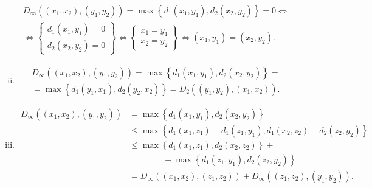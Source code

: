 \begin{eje}
\begin{enumerate}[(a)]
\begin{enumerate}[i)]
            \begin{gather*}
                D_{\infty} \left( \left( x_1, x_2 \right) , \left( y_1 , y_2 \right) \right) = \max \left\{ d_1 \left( x_1, y_1\right) , d_2 \left( x_2 , y_2 \right) \right\} = 0  \iff \\
                \iff \left\{ \begin{array}{c}
                    d_1 \left( x_1, y_1 \right) = 0 \\
                    d_2 \left( x_2, y_2 \right) = 0
                \end{array} \right\} \iff  \left\{ \begin{array}{c}
                    x_1=y_1 \\
                    x_2=y_2
                \end{array} \right\} \iff \left( x_1, y_1 \right) = \left( x_2, y_2 \right).
            \end{gather*}
            \item 
            \begin{gather*}
                D_{\infty} \left( \left( x_1, x_2 \right) , \left( y_1 , y_2 \right) \right) = \max \left\{ d_1 \left( x_1, y_1\right)  , d_2 \left( x_2 , y_2 \right) \right\} = \\
                = \max \left\{ d_1 \left( y_1, x_1\right) , d_2 \left( y_2 , x_2 \right) \right\} =D_2 \left( \left( y_1, y_2 \right) , \left( x_1 , x_2 \right) \right) .
            \end{gather*}
            \item 
            \begin{align*}
                D_{\infty} \left( \left( x_1, x_2 \right) , \left( y_1 , y_2 \right) \right) &= \max \left\{ d_1 \left( x_1, y_1\right) , d_2 \left( x_2 , y_2 \right) \right\} \\
                &\leq \max \left\{ d_1 \left( x_1, z_1 \right) +d_1 \left( z_1, y_1 \right) , d_1 \left( x_2, z_2 \right) +d_2 \left( z_2, y_2 \right)  \right\} \\
                &\leq \max \left\{ d_1 \left( x_1, z_1\right) , d_2 \left( x_2 , z_2 \right) \right\} + \\
                &\qquad\qquad + \max \left\{ d_1 \left( z_1, y_1\right) , d_2 \left( z_2 , y_2 \right) \right\} \\
                &= D_{\infty} \left( \left( x_1, x_2 \right) , \left( z_1 , z_2 \right) \right) + D_{\infty} \left( \left( z_1, z_2 \right) , \left( y_1 , y_2 \right) \right).
            \end{align*}

\end{enumerate}
\end{enumerate}
\end{eje}
